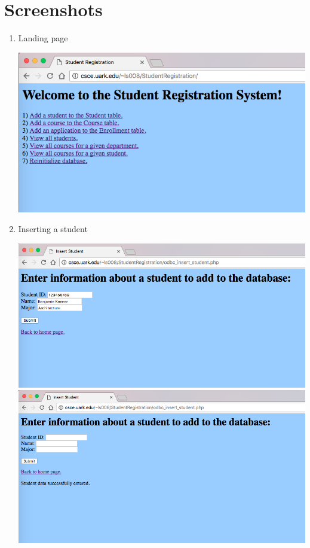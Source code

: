 \documentclass{article}      %
\begin{document}
\section*{Screenshots}
\begin{enumerate}
\item Landing page

	\includegraphics[width=\textwidth]{HomeScreen}


\item Inserting a student

	\includegraphics[width=\textwidth]{InsertStudentBefore}
	\includegraphics[width=\textwidth]{InsertStudentAfter}



\end{enumerate}
\end{document}
